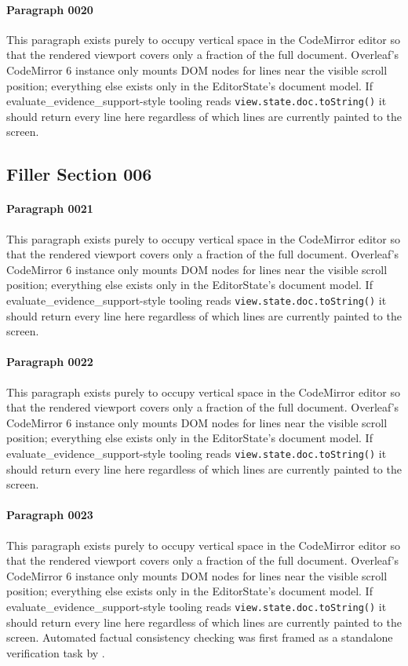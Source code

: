 \documentclass{article}
\begin{document}
\paragraph{Paragraph 0020}
This paragraph exists purely to occupy vertical space in the CodeMirror editor so that the rendered viewport covers only a fraction of the full document. Overleaf's CodeMirror 6 instance only mounts DOM nodes for lines near the visible scroll position; everything else exists only in the EditorState's document model. If evaluate\_evidence\_support-style tooling reads \texttt{view.state.doc.toString()} it should return every line here regardless of which lines are currently painted to the screen.

\subsection{Filler Section 006}
\paragraph{Paragraph 0021}
This paragraph exists purely to occupy vertical space in the CodeMirror editor so that the rendered viewport covers only a fraction of the full document. Overleaf's CodeMirror 6 instance only mounts DOM nodes for lines near the visible scroll position; everything else exists only in the EditorState's document model. If evaluate\_evidence\_support-style tooling reads \texttt{view.state.doc.toString()} it should return every line here regardless of which lines are currently painted to the screen.

\paragraph{Paragraph 0022}
This paragraph exists purely to occupy vertical space in the CodeMirror editor so that the rendered viewport covers only a fraction of the full document. Overleaf's CodeMirror 6 instance only mounts DOM nodes for lines near the visible scroll position; everything else exists only in the EditorState's document model. If evaluate\_evidence\_support-style tooling reads \texttt{view.state.doc.toString()} it should return every line here regardless of which lines are currently painted to the screen.

\paragraph{Paragraph 0023}
This paragraph exists purely to occupy vertical space in the CodeMirror editor so that the rendered viewport covers only a fraction of the full document. Overleaf's CodeMirror 6 instance only mounts DOM nodes for lines near the visible scroll position; everything else exists only in the EditorState's document model. If evaluate\_evidence\_support-style tooling reads \texttt{view.state.doc.toString()} it should return every line here regardless of which lines are currently painted to the screen. Automated factual consistency checking was first framed as a standalone verification task by \citet{alavarez2020claimcheck}.
\end{document}
